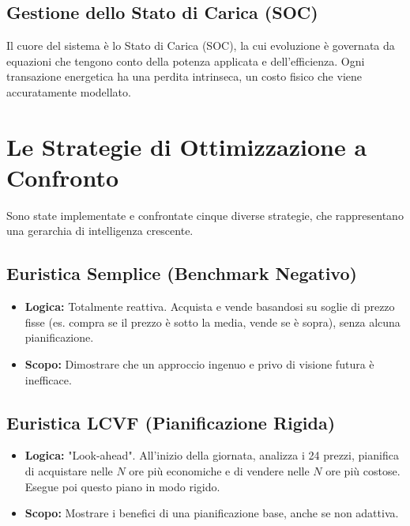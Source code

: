 \documentclass[11pt, a4paper]{article}
\begin{document}
\subsection{Gestione dello Stato di Carica (SOC)}
Il cuore del sistema è lo Stato di Carica (SOC), la cui evoluzione è governata da equazioni che tengono conto della potenza applicata e dell'efficienza. Ogni transazione energetica ha una perdita intrinseca, un costo fisico che viene accuratamente modellato.

\section{Le Strategie di Ottimizzazione a Confronto}
Sono state implementate e confrontate cinque diverse strategie, che rappresentano una gerarchia di intelligenza crescente.

\subsection{Euristica Semplice (Benchmark Negativo)}
\begin{itemize}
    \item \textbf{Logica:} Totalmente reattiva. Acquista e vende basandosi su soglie di prezzo fisse (es. compra se il prezzo è sotto la media, vende se è sopra), senza alcuna pianificazione.
    \item \textbf{Scopo:} Dimostrare che un approccio ingenuo e privo di visione futura è inefficace.
\end{itemize}

\subsection{Euristica LCVF (Pianificazione Rigida)}
\begin{itemize}
    \item \textbf{Logica:} "Look-ahead". All'inizio della giornata, analizza i 24 prezzi, pianifica di acquistare nelle $N$ ore più economiche e di vendere nelle $N$ ore più costose. Esegue poi questo piano in modo rigido.
    \item \textbf{Scopo:} Mostrare i benefici di una pianificazione base, anche se non adattiva.
\end{itemize}
\end{document}

